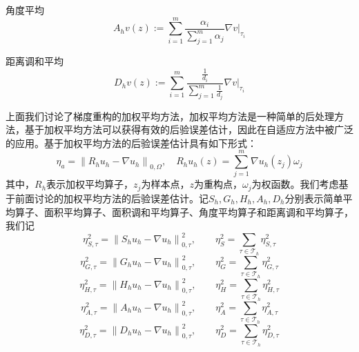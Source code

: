 \documentclass{article}
\begin{document}
角度平均
\begin{equation*}
A_hv(z):=\sum\limits_{i=1}^m\frac{\alpha_i}{\sum\limits_{j=1}^m\alpha_j}\nabla v\big|_{\tau_i}
\end{equation*}

距离调和平均
\begin{equation*}
D_hv(z):=\sum\limits_{i=1}^m\frac{\frac{1}{d_i}}{\sum\limits_{j=1}^m\frac{1}{d_j}}\nabla v\big|_{\tau_i}
\end{equation*}

上面我们讨论了梯度重构的加权平均方法，加权平均方法是一种简单的后处理方法，基于加权平均方法可以获得有效的后验误差估计，因此在自适应方法中被广泛的应用。基于加权平均方法的后验误差估计具有如下形式：
\begin{equation*}
\eta_a=\left\|R_hu_h-\nabla u_h\right\|_{0,\Omega},\quad R_hu_h(z)=\sum\limits_{j=1}^{m}\nabla u_h(z_j)\omega_j
\end{equation*}
其中，$R_h$表示加权平均算子，$z_j$为样本点，$z$为重构点，$\omega_j$为权函数。我们考虑基于前面讨论的加权平均方法的后验误差估计。记$S_h,G_h,H_h,A_h,D_h$分别表示简单平均算子、面积平均算子、面积调和平均算子、角度平均算子和距离调和平均算子，我们记
\begin{equation*}
\eta_{S,\tau}^2=\left\|S_hu_h-\nabla u_h\right\|_{0,\tau}^2,\qquad\eta_S^2=\sum\limits_{\tau\in\mathcal{T}_h}\eta_{S,\tau}^2
\end{equation*}
\begin{equation*}
\eta_{G,\tau}^2=\left\|G_hu_h-\nabla u_h\right\|_{0,\tau}^2,\qquad\eta_G^2=\sum\limits_{\tau\in\mathcal{T}_h}\eta_{G,\tau}^2
\end{equation*}
\begin{equation*}
\eta_{H,\tau}^2=\left\|H_hu_h-\nabla u_h\right\|_{0,\tau}^2,\qquad\eta_H^2=\sum\limits_{\tau\in\mathcal{T}_h}\eta_{H,\tau}^2
\end{equation*}
\begin{equation*}
\eta_{A,\tau}^2=\left\|A_hu_h-\nabla u_h\right\|_{0,\tau}^2,\qquad\eta_A^2=\sum\limits_{\tau\in\mathcal{T}_h}\eta_{A,\tau}^2
\end{equation*}
\begin{equation*}
\eta_{D,\tau}^2=\left\|D_hu_h-\nabla u_h\right\|_{0,\tau}^2,\qquad\eta_D^2=\sum\limits_{\tau\in\mathcal{T}_h}\eta_{D,\tau}^2
\end{equation*}
\end{document}
